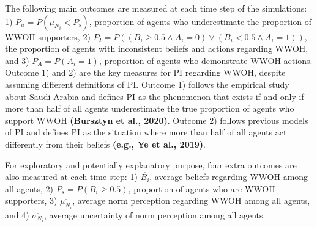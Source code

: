 \documentclass[
  11pt,
]{article}
\begin{document}
The following main outcomes are measured at each time step of the
simulations: 1) \(P_u = P(\mu_{N_i} < P_s)\), proportion of agents who
underestimate the proportion of WWOH supporters, 2)
\(P_I = P((B_i \ge 0.5 \wedge A_i = 0) \vee (B_i < 0.5 \wedge A_i = 1))\),
the proportion of agents with inconsistent beliefs and actions regarding
WWOH, and 3) \(P_A = P(A_i = 1)\), proportion of agents who demonstrate
WWOH actions. Outcome 1) and 2) are the key measures for PI regarding
WWOH, despite assuming different definitions of PI. Outcome 1) follows
the empirical study about Saudi Arabia and defines PI as the phenomenon
that exists if and only if more than half of all agents underestimate
the true proportion of agents who support WWOH \textbf{(Bursztyn et al.,
2020)}. Outcome 2) follows previous models of PI and defines PI as the
situation where more than half of all agents act differently from their
beliefs \textbf{(e.g., Ye et al., 2019)}.

For exploratory and potentially explanatory purpose, four extra outcomes
are also measured at each time step: 1) \(\overline{B_i}\), average
beliefs regarding WWOH among all agents, 2) \(P_s = P(B_i \ge 0.5)\),
proportion of agents who are WWOH supporters, 3)
\(\overline{\mu_{N_i}}\), average norm perception regarding WWOH among
all agents, and 4) \(\overline{\sigma_{N_i}}\), average uncertainty of
norm perception among all agents.

\newpage
\end{document}

